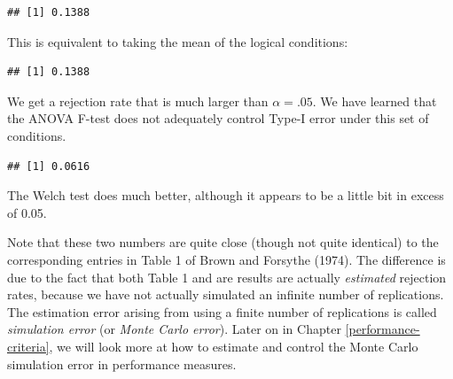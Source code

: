\documentclass[
]{book}
\newenvironment{Shaded}{\begin{snugshade}}{\end{snugshade}}
\newcommand{\DecValTok}[1]{\textcolor[rgb]{0.00,0.00,0.81}{#1}}
\newcommand{\FloatTok}[1]{\textcolor[rgb]{0.00,0.00,0.81}{#1}}
\newcommand{\FunctionTok}[1]{\textcolor[rgb]{0.13,0.29,0.53}{\textbf{#1}}}
\newcommand{\NormalTok}[1]{#1}
\newcommand{\SpecialCharTok}[1]{\textcolor[rgb]{0.81,0.36,0.00}{\textbf{#1}}}
\begin{document}
\begin{Shaded}
\end{Shaded}

\begin{verbatim}
## [1] 0.1388
\end{verbatim}

This is equivalent to taking the mean of the logical conditions:

\begin{Shaded}
\end{Shaded}

\begin{verbatim}
## [1] 0.1388
\end{verbatim}

We get a rejection rate that is much larger than \(\alpha = .05\).
We have learned that the ANOVA F-test does not adequately control Type-I error under this set of conditions.

\begin{Shaded}
\end{Shaded}

\begin{verbatim}
## [1] 0.0616
\end{verbatim}

The Welch test does much better, although it appears to be a little bit in excess of 0.05.

Note that these two numbers are quite close (though not quite identical) to the corresponding entries in Table 1 of Brown and Forsythe (1974). The difference is due to the fact that both Table 1 and are results are actually \emph{estimated} rejection rates, because we have not actually simulated an infinite number of replications. The estimation error arising from using a finite number of replications is called \emph{simulation error} (or \emph{Monte Carlo error}).
Later on in Chapter \ref{performance-criteria}, we will look more at how to estimate and control the Monte Carlo simulation error in performance measures.
\end{document}
